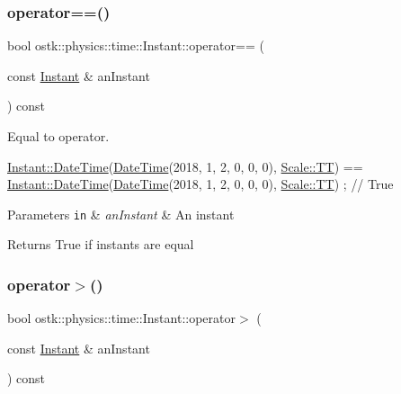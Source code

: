 \subsubsection{\texorpdfstring{operator==()}{operator==()}}
{\footnotesize\ttfamily bool ostk\+::physics\+::time\+::\+Instant\+::operator== (\begin{DoxyParamCaption}\item[{const \hyperlink{classostk_1_1physics_1_1time_1_1_instant}{Instant} \&}]{an\+Instant }\end{DoxyParamCaption}) const}



Equal to operator. 


\begin{DoxyCode}
\hyperlink{classostk_1_1physics_1_1time_1_1_instant_afd5725574a02389b80fad4baff313c8a}{Instant::DateTime}(\hyperlink{classostk_1_1physics_1_1time_1_1_instant_afd5725574a02389b80fad4baff313c8a}{DateTime}(2018, 1, 2, 0, 0, 0), 
      \hyperlink{namespaceostk_1_1physics_1_1time_adf23d37bd8641fb76a0e98ab46a70df7adf1f3edb9115acb0a1e04209b7a9937b}{Scale::TT}) == \hyperlink{classostk_1_1physics_1_1time_1_1_instant_afd5725574a02389b80fad4baff313c8a}{Instant::DateTime}(\hyperlink{classostk_1_1physics_1_1time_1_1_instant_afd5725574a02389b80fad4baff313c8a}{DateTime}(2018, 1, 2, 0, 0, 0), 
      \hyperlink{namespaceostk_1_1physics_1_1time_adf23d37bd8641fb76a0e98ab46a70df7adf1f3edb9115acb0a1e04209b7a9937b}{Scale::TT}) ; \textcolor{comment}{// True}
\end{DoxyCode}



\begin{DoxyParams}[1]{Parameters}
\mbox{\tt in}  & {\em an\+Instant} & An instant \\
\hline
\end{DoxyParams}
\begin{DoxyReturn}{Returns}
True if instants are equal 
\end{DoxyReturn}
\mbox{\label{classostk_1_1physics_1_1time_1_1_instant_a1e73faadcf3c6724a5e67f35db007697}} 
\subsubsection{\texorpdfstring{operator$>$()}{operator>()}}
{\footnotesize\ttfamily bool ostk\+::physics\+::time\+::\+Instant\+::operator$>$ (\begin{DoxyParamCaption}\item[{const \hyperlink{classostk_1_1physics_1_1time_1_1_instant}{Instant} \&}]{an\+Instant }\end{DoxyParamCaption}) const}



